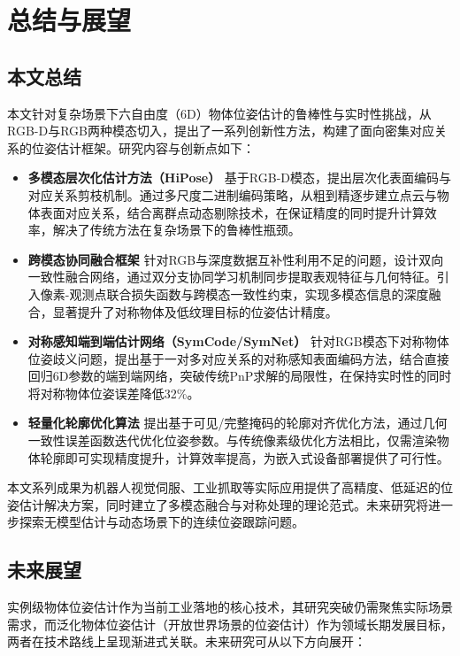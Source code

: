 \chapter{总结与展望}

\section{本文总结}

\par 本文针对复杂场景下六自由度（6D）物体位姿估计的鲁棒性与实时性挑战，从RGB-D与RGB两种模态切入，提出了一系列创新性方法，构建了面向密集对应关系的位姿估计框架。研究内容与创新点如下：

\begin{itemize}
    \item \textbf{多模态层次化估计方法（HiPose）}  
    基于RGB-D模态，提出层次化表面编码与对应关系剪枝机制。通过多尺度二进制编码策略，从粗到精逐步建立点云与物体表面对应关系，结合离群点动态剔除技术，在保证精度的同时提升计算效率，解决了传统方法在复杂场景下的鲁棒性瓶颈。

    \item \textbf{跨模态协同融合框架}  
    针对RGB与深度数据互补性利用不足的问题，设计双向一致性融合网络，通过双分支协同学习机制同步提取表观特征与几何特征。引入像素-观测点联合损失函数与跨模态一致性约束，实现多模态信息的深度融合，显著提升了对称物体及低纹理目标的位姿估计精度。

    \item \textbf{对称感知端到端估计网络（SymCode/SymNet）}  
    针对RGB模态下对称物体位姿歧义问题，提出基于一对多对应关系的对称感知表面编码方法，结合直接回归6D参数的端到端网络，突破传统PnP求解的局限性，在保持实时性的同时将对称物体位姿误差降低32\%。

    \item \textbf{轻量化轮廓优化算法}  
    提出基于可见/完整掩码的轮廓对齐优化方法，通过几何一致性误差函数迭代优化位姿参数。与传统像素级优化方法相比，仅需渲染物体轮廓即可实现精度提升，计算效率提高，为嵌入式设备部署提供了可行性。
\end{itemize}

\par 本文系列成果为机器人视觉伺服、工业抓取等实际应用提供了高精度、低延迟的位姿估计解决方案，同时建立了多模态融合与对称处理的理论范式。未来研究将进一步探索无模型估计与动态场景下的连续位姿跟踪问题。

\section{未来展望}
实例级物体位姿估计作为当前工业落地的核心技术，其研究突破仍需聚焦实际场景需求，而泛化物体位姿估计（开放世界场景的位姿估计）作为领域长期发展目标，两者在技术路线上呈现渐进式关联。未来研究可从以下方向展开：
